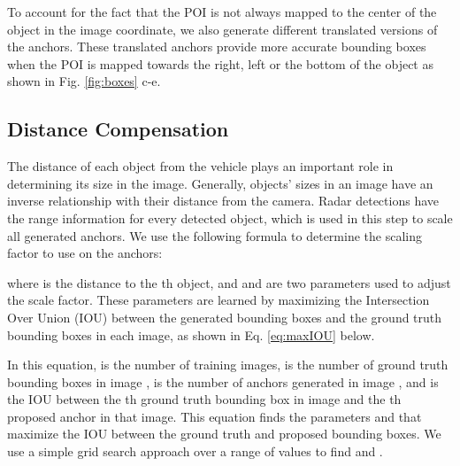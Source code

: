 \documentclass{article}
\begin{document}
To account for the fact that the POI is not always mapped to the center of the object 
in the image coordinate, we also generate different translated versions of the 
anchors. These translated anchors provide more accurate bounding boxes when the 
POI is mapped towards the right, left or the bottom of the object as shown in 
Fig. \ref{fig:boxes} c-e.

\subsection{Distance Compensation}
The distance of each object from the vehicle plays an important role in 
determining its size in the image. Generally, objects' sizes in an image have 
an inverse relationship with their distance from the camera. Radar detections have 
the range information for every detected object, which is used in this step to 
scale all generated anchors. We use the following formula to determine the scaling factor 
to use on the anchors:

where  is the distance to the th object, and  and  are two 
parameters used to adjust the scale 
factor. These parameters are learned by maximizing the Intersection Over Union (IOU) 
between the generated bounding 
boxes and the ground truth bounding boxes in each image, as shown in 
Eq. \ref{eq:maxIOU} below.

In this equation,  is the number of training images,  is the number of ground truth 
bounding boxes in image , 
 is the number of anchors generated in image , and  is the IOU 
between the th ground truth bounding box in image  and the th proposed 
anchor in that image. This equation finds the parameters  and  
that maximize the IOU between the ground truth and proposed bounding boxes. We use a simple grid search approach over a range of values to find  and .
\end{document}
